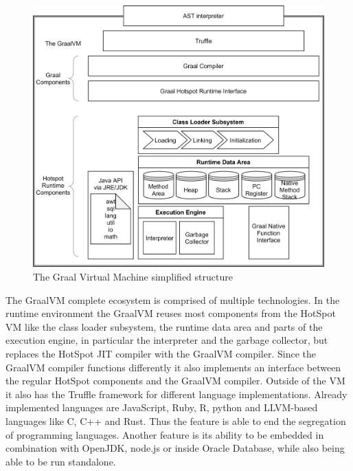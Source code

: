 \begin{figure}[h!]
    \centering
    \includegraphics[scale=0.8]{figures/GraalVM.png}
    \caption{The Graal Virtual Machine simplified structure}
    \label{fig:graalvm}
\end{figure}

The GraalVM complete ecosystem is comprised of multiple technologies. In the runtime environment the GraalVM reuses most components from the HotSpot VM like the class loader subsystem, the runtime data area and parts of the execution engine, in particular the interpreter and the garbage collector, but replaces the HotSpot JIT compiler with the GraalVM compiler. Since the GraalVM compiler functions differently it also implements an interface between the regular HotSpot components and the GraalVM compiler. Outside of the VM it also has the Truffle framework for different language implementations. Already implemented languages are JavaScript, Ruby, R, python and LLVM-based languages like C, C++ and Rust. Thus the feature is able to end the segregation of programming languages. Another feature is its ability to be embedded in combination with OpenJDK, node.js or inside Oracle Database, while also being able to be run standalone. \cite{graalVMStart}
